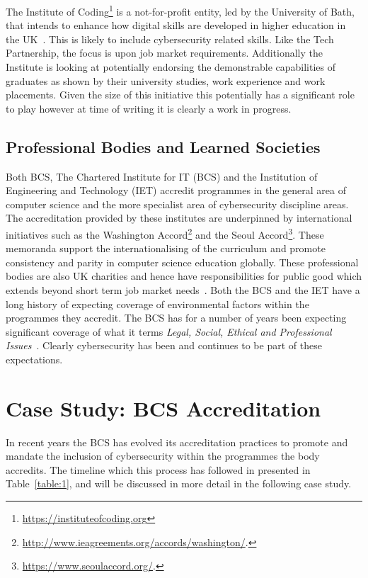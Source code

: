 \documentclass[conference]{IEEEtran}
\begin{document}
{The Institute of Coding\footnote{\url{https://instituteofcoding.org}} is a not-for-profit entity, led by the University of Bath, that intends to enhance how digital skills are developed in higher education in the UK~\cite{Davenportetal2019a}. This is likely to include cybersecurity related skills. Like the Tech Partnership, the focus is upon job market requirements. Additionally the Institute is looking at potentially endorsing the demonstrable capabilities of graduates as shown by their university studies, work experience and work placements. Given the size of this initiative this potentially has a significant role to play however at time of writing it is clearly a work in progress.

\subsection{Professional Bodies and Learned Societies}

Both BCS, The Chartered Institute for IT (BCS) and the Institution of Engineering and Technology (IET) accredit programmes in the general area of computer science and the more specialist area of cybersecurity discipline areas. The accreditation provided by these institutes are underpinned by international initiatives such as the Washington Accord\footnote{\url{http://www.ieagreements.org/accords/washington/}.} and the Seoul Accord\footnote{\url{https://www.seoulaccord.org/}.}. These memoranda support the internationalising of the curriculum and promote consistency and parity in computer science education globally.  These professional bodies are also UK charities and hence have responsibilities for public good which extends beyond short term job market needs~\cite{Stensaker2006,Mutereko2017}. Both the BCS and the IET have a long history of expecting coverage of environmental factors within the programmes they accredit. The BCS has for a number of years been expecting significant coverage of what it terms  {\emph{Legal, Social, Ethical and Professional Issues}}~\cite{Brooke2018}. Clearly cybersecurity has been and continues to be part of these expectations. 

\section{Case Study: BCS Accreditation}

In recent years the BCS has evolved its accreditation practices to promote and mandate the inclusion of cybersecurity within the programmes the body accredits. The timeline which this process has followed in presented in Table~\ref{table:1}, and will be discussed in more detail in the following case study.

}
\end{document}
